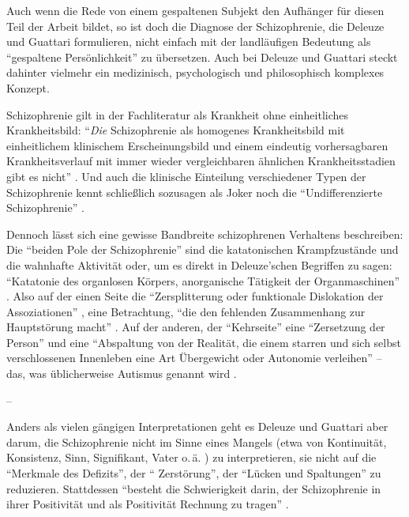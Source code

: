 \documentclass[12pt,
               DIV13,
               paper=a4,
               twoside=false,
               onehalfspacing,
               bibliography=totoc,
               toc=graduated,
               draft,
               ]{scrartcl}
\newcommand{\pc}[2]{\parencite[#1]{#2}}
\newcommand{\vgl}[2]{\parencite[vgl.][#1]{#2}}
\newcommand{\worries}[1]{\ifdraft{\textcolor{blue}{\texttt{(#1)}}}{}}
\begin{document}
Auch wenn die Rede von einem gespaltenen Subjekt den Aufhänger für
diesen Teil der Arbeit bildet, so ist doch die Diagnose der
Schizophrenie, die Deleuze und Guattari formulieren, nicht einfach mit
der landläufigen Bedeutung als "`gespaltene Persönlichkeit"' zu
übersetzen. Auch bei Deleuze und Guattari steckt dahinter vielmehr ein
medizinisch, psychologisch und philosophisch komplexes Konzept.

Schizophrenie gilt in der Fachliteratur als Krankheit ohne
einheitliches Krankheitsbild: "`\emph{Die} Schizophrenie als homogenes
Krankheitsbild mit einheitlichem klinischem Erscheinungsbild und einem
eindeutig vorhersagbaren Krankheitsverlauf mit immer wieder
vergleichbaren ähnlichen Krankheitsstadien gibt es nicht"'
\pc{799}{psych}. Und auch die klinische Einteilung verschiedener Typen
der Schizophrenie kennt schließlich sozusagen als Joker noch die
"`Undifferenzierte Schizophrenie"' \worries{?}.

Dennoch lässt sich eine gewisse Bandbreite schizophrenen Verhaltens
beschreiben: Die "`beiden Pole der Schizophrenie"' \pc{21}{schizg}
sind die katatonischen Krampfzustände und die wahnhafte Aktivität
oder, um es direkt in Deleuze'schen Begriffen zu sagen: "`Katatonie
des organlosen Körpers, anorganische Tätigkeit der Organmaschinen"'
\pc{21}{schizg}. Also auf der einen Seite die "`Zersplitterung oder
funktionale Dislokation der Assoziationen"' \pc{23}{schizg}, eine
Betrachtung, "`die den fehlenden Zusammenhang zur Hauptstörung macht"'
\pc{23}{schizg}. Auf der anderen, der "`Kehrseite"' eine "`Zersetzung
der Person"' und eine "`Abspaltung von der Realität, die einem
starren und sich selbst verschlossenen Innenleben eine Art Übergewicht
oder Autonomie verleihen"' \pc{23}{schizg} -- das, was üblicherweise
Autismus genannt wird \vgl{801}{psych}.

--

Anders als vielen gängigen Interpretationen geht es Deleuze und
Guattari aber darum, die Schizophrenie nicht im Sinne eines Mangels
(etwa von Kontinuität, Konsistenz, Sinn, Signifikant, Vater o.\,ä.
\vgl{xx}{ao}) zu interpretieren, sie nicht auf die "`Merkmale des
Defizits"', der "` Zerstörung"', der "`Lücken und Spaltungen"'
\pc{24}{schizg} zu reduzieren. Stattdessen "`besteht die Schwierigkeit
darin, der Schizophrenie in ihrer Positivität und als Positivität
Rechnung zu tragen"' \pc{24}{schizg}.
\end{document}
